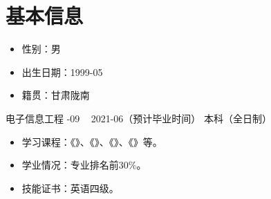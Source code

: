 \section{\kaishu 基本信息}
\begin{itemize}
    \item {\kaishu 性别：男}
    \item {\kaishu 出生日期：1999-05}
    \item {\kaishu 籍贯：甘肃陇南} 
\end{itemize}
    
    {\kaishu 电子信息工程}
    {-09 ~ 2021-06（预计毕业时间）}
    {本科（全日制）}

\begin{itemize}
    \item  {\kaishu 学习课程：《》、《》、《》、《》等。}
    \item {\kaishu 学业情况：专业排名前30\%。}
    \item {\kaishu 技能证书：英语四级。}
\end{itemize}